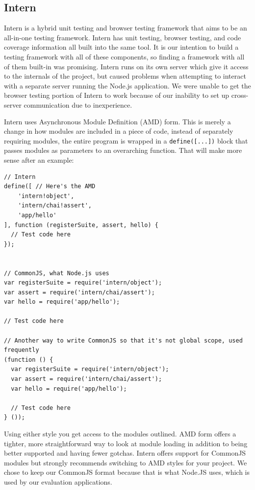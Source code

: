 \documentclass[12pt]{ucthesis}
\begin{document}
\subsection{Intern}
Intern\cite{InternIO} is a hybrid unit testing and browser testing framework that aims to be an all-in-one testing framework. Intern has unit testing, browser testing, and code coverage information all built into the same tool. It is our intention to build a testing framework with all of these components, so finding a framework with all of them built-in was promising. Intern runs on its own server which give it access to the internals of the project, but caused problems when attempting to interact with a separate server running the Node.js application. We were unable to get the browser testing portion of Intern to work because of our inability to set up cross-server communication due to inexperience.

Intern uses Asynchronous Module Definition (AMD) form. This is merely a change in how modules are included in a piece of code, instead of separately requiring modules, the entire program is wrapped in a \lstinline{define([...])} block that passes modules as parameters to an overarching function. That will make more sense after an example:
\begin{lstlisting}
// Intern
define([ // Here's the AMD
    'intern!object',
    'intern/chai!assert',
    'app/hello'
], function (registerSuite, assert, hello) {
  // Test code here
});


// CommonJS, what Node.js uses 
var registerSuite = require('intern/object');
var assert = require('intern/chai/assert');
var hello = require('app/hello');

// Test code here

// Another way to write CommonJS so that it's not global scope, used frequently
(function () {
  var registerSuite = require('intern/object');
  var assert = require('intern/chai/assert');
  var hello = require('app/hello');

  // Test code here
} ());
\end{lstlisting}

Using either style you get access to the modules outlined. AMD form offers a tighter, more straightforward way to look at module loading in addition to being better supported and having fewer gotchas. \cite{AMDInfo} Intern offers support for CommonJS modules but strongly recommends switching to AMD styles for your project. We chose to keep our CommonJS format because that is what Node.JS uses, which is used by our evaluation applications.
\end{document}
